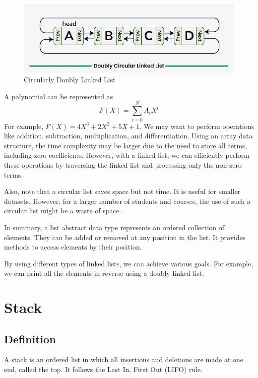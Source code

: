 \begin{center}
\begin{minipage}{0.45\textwidth}
\begin{figure}[H]
  \centering
  \includegraphics[width=\textwidth]{Figure/double-cir-linked-list.png}
  \caption{Circularly Doubly Linked List}
\end{figure}
\end{minipage}
\end{center}

A polynomial can be represented as
\[
  F(X) = \sum_{i = 0}^N A_{i} X^i
\]
For example, \(F(X) = 4X^3 + 2X^2 + 5X + 1\). We may want to perform operations like addition, subtraction, multiplication, and differentiation. Using an array data structure, the time complexity may be larger due to the need to store all terms, including zero coefficients. However, with a linked list, we can efficiently perform these operations by traversing the linked list and processing only the non-zero terms.

Also, note that a circular list saves space but not time. It is useful for smaller datasets. However, for a larger number of students and courses, the use of such a circular list might be a waste of space.

In summary, a list abstract data type represents an ordered collection of elements. They can be added or removed at any position in the list. It provides methods to access elements by their position.

By using different types of linked lists, we can achieve various goals. For example, we can print all the elements in reverse using a doubly linked list.

\section{Stack}
\subsection{Definition}
A stack is an ordered list in which all insertions and deletions are made at one end, called the top. It follows the Last In, First Out (LIFO) rule.

